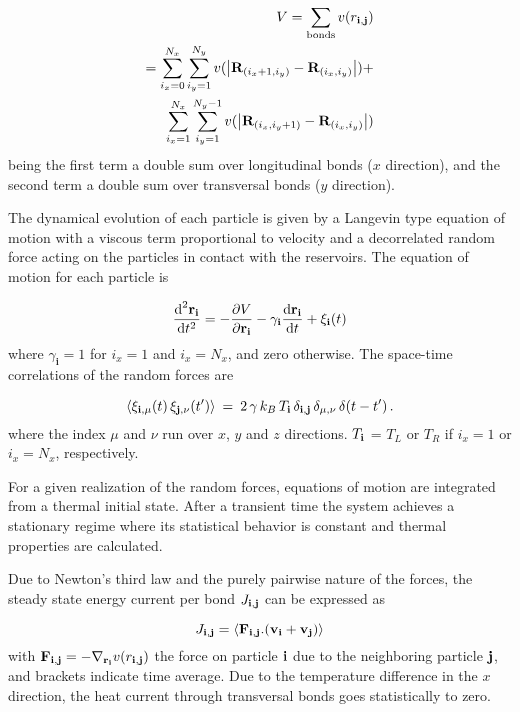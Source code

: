 \documentclass[12pt]{article}
\begin{document}
\begin{equation}
\begin{split}
V= \sum_{\text{bonds}} v(r_{\bf{i,j}}) \\
=\sum_{i_{x}=0}^{N_{x}}\sum_{i_{y}=1}^{N_{y}} v(\left|\textbf{R}_{(i_{x}+1,i_{y})}  - \textbf{R}_{(i_{x},i_{y})}\right|) + \\
\sum_{i_{x}=1}^{N_{x}}\sum_{i_{y}=1}^{N_{y}-1} v(\left|\textbf{R}_{(i_{x},i_{y}+1)} - \textbf{R}_{(i_{x},i_{y})}\right|)%
\end{split}
\end{equation}
being the first term a double sum over longitudinal bonds ($x$ direction), and the second term a double sum over transversal bonds ($y$ direction).

The dynamical evolution of each particle is given by a Langevin type equation of motion with a viscous term proportional to velocity and a decorrelated random force acting on the particles in contact with the reservoirs. The equation of motion for each particle is

\begin{equation} \label{Newton}
\frac{\text{d}^2 \bold{r}_{\bold{i}} }{\text{d} t^2}  = - \frac{\partial V }{\partial \bold{r}_{\bold{i}} } - \gamma_{\bold{i}} \frac{\text{d} \bold{r}_{\bold{i}} }{\text{d} t} + \bold{\xi}_{\bold{i}} (t)
\end{equation}
where $\gamma_{\mathbf{i}} = 1$ for $i_x =1$ and $i_x = N_x$, and zero otherwise. The space-time correlations of the random forces are

\begin{equation}
\langle \xi_{{\bf i},\mu}(t)\,\xi_{{\bf j},\nu}(t') \rangle \:=\: 2\, \gamma\, k_{B}\, T_{{\bf i}}\, \delta_{{\bf i},{\bf j}}\, \delta_{\mu,\nu}\, \delta(t-t')\,.
\end{equation}
where the index $\mu$ and $\nu$ run over $x$, $y$ and $z$ directions. $T_{{\bf i}}$ = $T_{L}$ or $T_{R}$ if $i_{x}=1$ or $i_{x}=N_{x}$, respectively.

For a given realization of the random forces, equations of motion are integrated from a thermal initial state. After a transient time the system achieves a stationary regime where its statistical behavior is constant and thermal properties are calculated. 

Due to Newton's third law and the purely pairwise nature of the forces, the steady state energy current per bond $J_{\bf i,j}$ can be expressed as

\begin{equation}
J_{\bf i,j} = \left\langle \bf{F_{i,j}.(v_{i}+v_{j})} \right\rangle
\label{J1}
\end{equation}
with ${\bf F_{i,j}}=-\nabla_{\bf r_{i}}  v( r_{\bf{i, j}} ) $ the force on particle ${\bf i}$ due to the neighboring particle ${\bf j}$, and brackets indicate time average. Due to the temperature difference in the $x$ direction, the heat current through transversal bonds goes statistically to zero.
\end{document}
